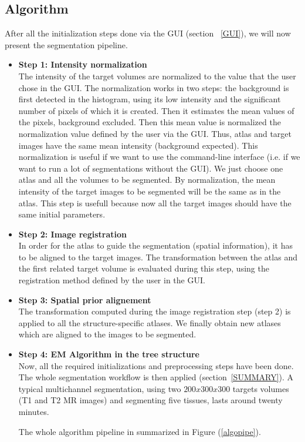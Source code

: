 \subsection{Algorithm}
After all the initialization steps done via the GUI (section ~\ref{GUI}), we will now present the segmentation pipeline.
%
\begin{itemize}
\item \textbf{Step 1: Intensity normalization}\\
\hspace*{4 mm}The intensity of the target volumes are normalized to the value that the user chose in the GUI. The normalization works in two steps: the background is first detected in the histogram, using its low intensity and the significant number of pixels of which it is created. Then it estimates the mean values of the pixels, background excluded. Then this mean value is normalized the normalization value defined by the user via the GUI. Thus, atlas and target images have the same mean intensity (background expected). This normalization is useful if we want to use the command-line interface (i.e. if we want to run a lot of segmentations without the GUI). We just choose one atlas and all the volumes to be segmented. By normalization, the mean intensity of the target images to be segmented will be the same as in the atlas. This step is usefull because now all the target images should have the same initial parameters.
%
\item \textbf{Step 2: Image registration}\\
\hspace*{4 mm}In order for the atlas to guide the segmentation (spatial information), it has to be aligned to the target images. The transformation between the atlas and the first related target volume is evaluated during this step, using the registration method defined by the user in the GUI.
%
\item \textbf{Step 3: Spatial prior alignement}\\
\hspace*{4 mm}The transformation computed during the image registration step (step 2) is applied to all the structure-specific atlases. We finally obtain new atlases which are aligned to the images to be segmented.
%
\item \textbf{Step 4: EM Algorithm in the tree structure}\\
\hspace*{4 mm}Now, all the required initializations and preprocessing steps have been done. The whole segmentation workflow is then applied (section~\ref{SUMMARY}). A typical multichannel segmentation, using two $200x300x300$ targets volumes (T1 and T2 MR images) and segmenting five tissues, lasts around twenty minutes.
\par
The whole algorithm pipeline in summarized in Figure (\ref{algopipe}).


\end{itemize}
